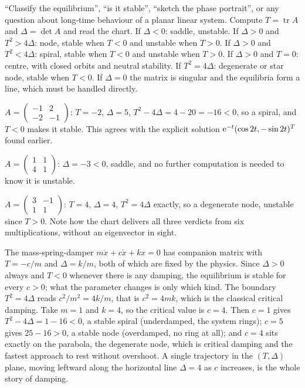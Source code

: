 \cue ``Classify the equilibrium'', ``is it stable'', ``sketch the phase portrait'', or any question about long-time behaviour of a planar linear system.
\method Compute $T=\operatorname{tr}A$ and $\Delta=\det A$ and read the chart. If $\Delta<0$: saddle, unstable. If $\Delta>0$ and $T^{2}>4\Delta$: node, stable when $T<0$ and unstable when $T>0$. If $\Delta>0$ and $T^{2}<4\Delta$: spiral, stable when $T<0$ and unstable when $T>0$. If $\Delta>0$ and $T=0$: centre, with closed orbits and neutral stability. If $T^{2}=4\Delta$: degenerate or star node, stable when $T<0$. If $\Delta=0$ the matrix is singular and the equilibria form a line, which must be handled directly.

\begin{worked}
$A=\begin{pmatrix}-1&2\\-2&-1\end{pmatrix}$: $T=-2$, $\Delta=5$, $T^{2}-4\Delta=4-20=-16<0$, so a spiral, and $T<0$ makes it stable. This agrees with the explicit solution $\mathrm{e}^{-t}(\cos2t,-\sin2t)^{T}$ found earlier.

$A=\begin{pmatrix}1&1\\4&1\end{pmatrix}$: $\Delta=-3<0$, saddle, and no further computation is needed to know it is unstable.

$A=\begin{pmatrix}3&-1\\1&1\end{pmatrix}$: $T=4$, $\Delta=4$, $T^{2}=4\Delta$ exactly, so a degenerate node, unstable since $T>0$. Note how the chart delivers all three verdicts from six multiplications, without an eigenvector in sight.
\end{worked}

\begin{worked}
The mass-spring-damper $m\ddot x+c\dot x+kx=0$ has companion matrix with $T=-c/m$ and $\Delta=k/m$, both of which are fixed by the physics. Since $\Delta>0$ always and $T<0$ whenever there is any damping, the equilibrium is stable for every $c>0$; what the parameter changes is only which kind. The boundary $T^{2}=4\Delta$ reads $c^{2}/m^{2}=4k/m$, that is $c^{2}=4mk$, which is the classical critical damping. Take $m=1$ and $k=4$, so the critical value is $c=4$. Then $c=1$ gives $T^{2}-4\Delta=1-16<0$, a stable spiral (underdamped, the system rings); $c=5$ gives $25-16>0$, a stable node (overdamped, no ring at all); and $c=4$ sits exactly on the parabola, the degenerate node, which is critical damping and the fastest approach to rest without overshoot. A single trajectory in the $(T,\Delta)$ plane, moving leftward along the horizontal line $\Delta=4$ as $c$ increases, is the whole story of damping.
\end{worked}

